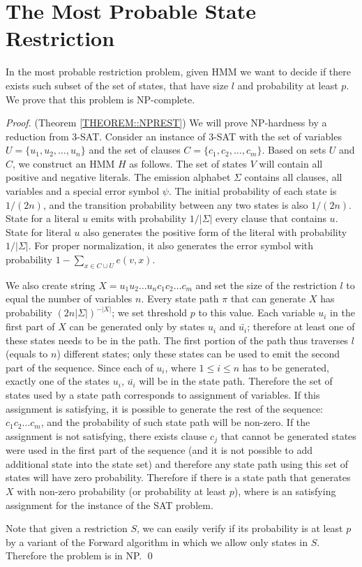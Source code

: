 \section{The Most Probable State Restriction}

\label{sec:restriction}

In the most probable restriction problem, given HMM we want to decide if there
exists such subset of the set of states, that have size $l$ and probability at
least $p$. We prove that this problem is NP-complete.

\begin{proof}(Theorem \ref{THEOREM::NPREST})
We will prove NP-hardness by a reduction from 3-SAT. Consider an
instance of 3-SAT with the set of variables $U=\{u_1,u_2,\dots,u_n\}$
and the set of clauses $C=\{c_1,c_2,\dots,c_m\}$. 
Based on sets $U$ and $C$, we construct an HMM $H$ as
follows.  The set of states $V$ will contain all positive and negative
literals. The emission alphabet $\Sigma$ contains all clauses, all
variables and a special error symbol $\psi$. The initial probability
of each state is $1/(2n)$, and the transition probability
between any two states is also $1/(2n)$. State for a literal
$u$ emits with probability $1/|\Sigma|$ every clause that contains $u$.
State for literal $u$ also generates the positive form of the literal
with probability $1/|\Sigma|$. For proper normalization, 
it also generates the error symbol 
with probability $1-\sum_{x\in C\cup U}e(v,x)$. 

We also create string $X=u_1u_2\dots
u_nc_1c_2\dots c_m$ and set the size of the restriction $l$ to equal
the number of variables $n$. Every state path $\pi$ that can generate
$X$ has probability $(2n|\Sigma|)^{-|X|}$; we set threshold $p$ to
this value. Each 
variable $u_i$ in the first part of $X$ 
can be generated only by states $u_i$ and
$\bar{u_i}$; therefore at least one of these states needs to be in the
path. The first portion of the path thus traverses $l$ (equals to $n$) 
different states; only these states can be used to emit the second part of the
sequence. Since each of $u_i$, where $1\leq i\leq n$ has to be generated,
exactly one of the states $u_i$, $\bar{u_i}$ will be in the state path.
Therefore the set of states used by a state path corresponds to assignment of
variables.  If this assignment is satisfying, it is possible to generate the
rest of the sequence: $c_1c_2\dots c_m$, and the probability of such state path
will be non-zero. If the assignment is not satisfying, there exists clause
$c_j$ that cannot be generated states were used in the first part of the
sequence (and it is not possible to add additional state into the state set)
and therefore any state path using this set of states will have zero
probability. Therefore if there is a state path that generates $X$ with
non-zero probability (or probability at least $p$), where is an satisfying
assignment for the instance of the SAT problem.

Note that given a restriction $S$, we can easily verify if its
probability is at least $p$ by a variant of the Forward algorithm
in which we allow only states in $S$. Therefore the problem is in NP.
\qed
\end{proof}


